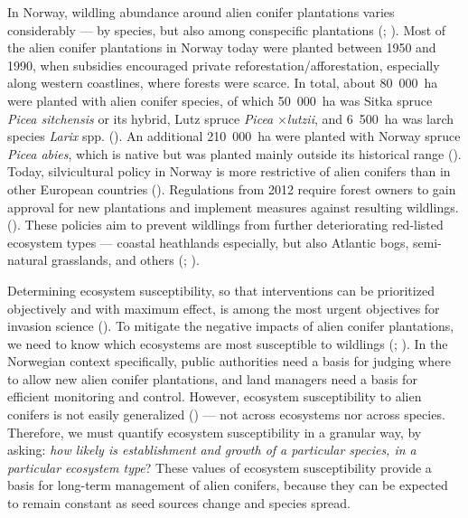 \documentclass[
]{article}
\begin{document}
In Norway, wildling abundance around alien conifer plantations varies
considerably --- by species, but also among conspecific plantations
(; ). Most of
the alien conifer plantations in Norway today were planted between 1950 and
1990, when subsidies encouraged private reforestation/afforestation, especially
along western coastlines, where forests were scarce. In total, about 80~000~ha
were planted with alien conifer species, of which 50~000~ha was Sitka spruce
\emph{Picea sitchensis} or its hybrid, Lutz spruce \emph{Picea} \(\times\)\emph{lutzii}, and
6~500~ha was larch species \emph{Larix} spp.
(). An additional 210~000~ha were planted
with Norway spruce \emph{Picea abies}, which is native but was planted mainly outside
its historical range (). Today,
silvicultural policy in Norway is more restrictive of alien conifers than in
other European countries (). Regulations
from 2012 require forest owners to gain approval for new plantations and
implement measures against resulting wildlings. ().
These policies aim to prevent wildlings from further deteriorating red-listed
ecosystem types --- coastal heathlands especially, but also Atlantic bogs,
semi-natural grasslands, and others (; ).

Determining ecosystem susceptibility, so that interventions can be prioritized
objectively and with maximum effect, is among the most urgent objectives for
invasion science (). To mitigate the negative
impacts of alien conifer plantations, we need to know which ecosystems are most
susceptible to wildlings (; ). In the Norwegian context specifically,
public authorities need a basis for judging where to allow new alien conifer
plantations, and land managers need a basis for efficient monitoring and
control. However, ecosystem susceptibility to alien conifers is not easily
generalized () --- not across ecosystems nor
across species. Therefore, we must quantify ecosystem susceptibility in a
granular way, by asking: \emph{how likely is establishment and growth of a particular
species, in a particular ecosystem type}? These values of ecosystem
susceptibility provide a basis for long-term management of alien conifers,
because they can be expected to remain constant as seed sources change and
species spread.
\end{document}
